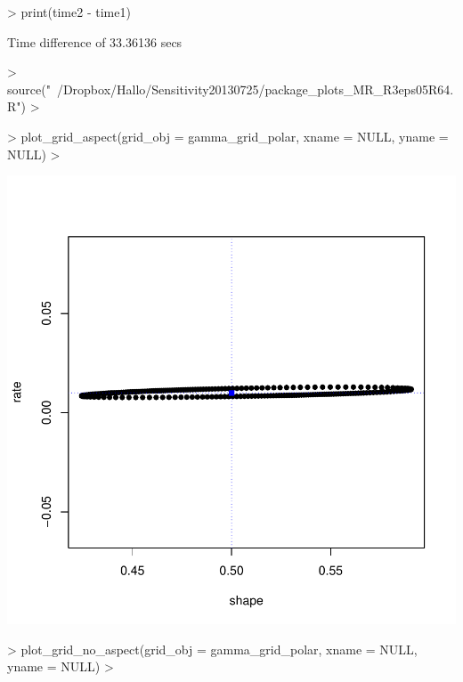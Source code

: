 \documentclass{article}
\begin{document}
\begin{Schunk}
\begin{Sinput}
> print(time2 - time1)
\end{Sinput}
\begin{Soutput}
Time difference of 33.36136 secs
\end{Soutput}
\begin{Sinput}
> source("~/Dropbox/Hallo/Sensitivity20130725/package_plots_MR_R3eps05R64.R")
> 
\end{Sinput}
\end{Schunk}
\begin{Schunk}
\begin{Sinput}
> plot_grid_aspect(grid_obj = gamma_grid_polar, xname = NULL, yname = NULL)
> 
\end{Sinput}
\end{Schunk}
\includegraphics{test_routines_0_0_1-009}
\begin{Schunk}
\begin{Sinput}
> plot_grid_no_aspect(grid_obj = gamma_grid_polar, xname = NULL, yname = NULL)
> 
\end{Sinput}
\end{Schunk}
\end{document}
